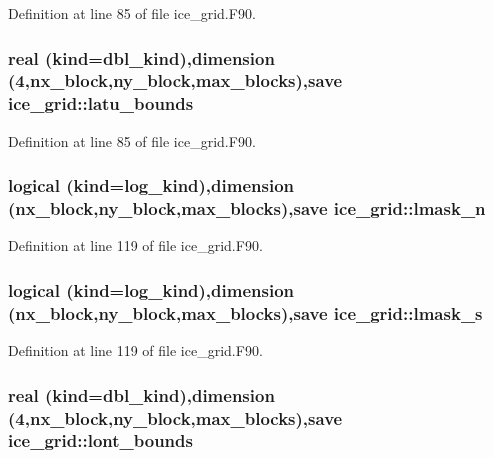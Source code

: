 Definition at line 85 of file ice\_\-grid.F90.\hypertarget{namespaceice__grid_a03b1e73bc95079d90193478f58f192ce}{
\subsubsection[{latu\_\-bounds}]{\setlength{\rightskip}{0pt plus 5cm}real (kind=dbl\_\-kind),dimension (4,nx\_\-block,ny\_\-block,max\_\-blocks),save {\bf ice\_\-grid::latu\_\-bounds}}}
\label{namespaceice__grid_a03b1e73bc95079d90193478f58f192ce}


Definition at line 85 of file ice\_\-grid.F90.\hypertarget{namespaceice__grid_ae9873cb5a374679eb9105cbd0b3adaef}{
\subsubsection[{lmask\_\-n}]{\setlength{\rightskip}{0pt plus 5cm}logical (kind=log\_\-kind),dimension (nx\_\-block,ny\_\-block,max\_\-blocks),save {\bf ice\_\-grid::lmask\_\-n}}}
\label{namespaceice__grid_ae9873cb5a374679eb9105cbd0b3adaef}


Definition at line 119 of file ice\_\-grid.F90.\hypertarget{namespaceice__grid_aab33134c872608cbbcb505d3f788bb2d}{
\subsubsection[{lmask\_\-s}]{\setlength{\rightskip}{0pt plus 5cm}logical (kind=log\_\-kind),dimension (nx\_\-block,ny\_\-block,max\_\-blocks),save {\bf ice\_\-grid::lmask\_\-s}}}
\label{namespaceice__grid_aab33134c872608cbbcb505d3f788bb2d}


Definition at line 119 of file ice\_\-grid.F90.\hypertarget{namespaceice__grid_ae3bd428fa166bb43e833ff27111c5d8e}{
\subsubsection[{lont\_\-bounds}]{\setlength{\rightskip}{0pt plus 5cm}real (kind=dbl\_\-kind),dimension (4,nx\_\-block,ny\_\-block,max\_\-blocks),save {\bf ice\_\-grid::lont\_\-bounds}}}
\label{namespaceice__grid_ae3bd428fa166bb43e833ff27111c5d8e}


